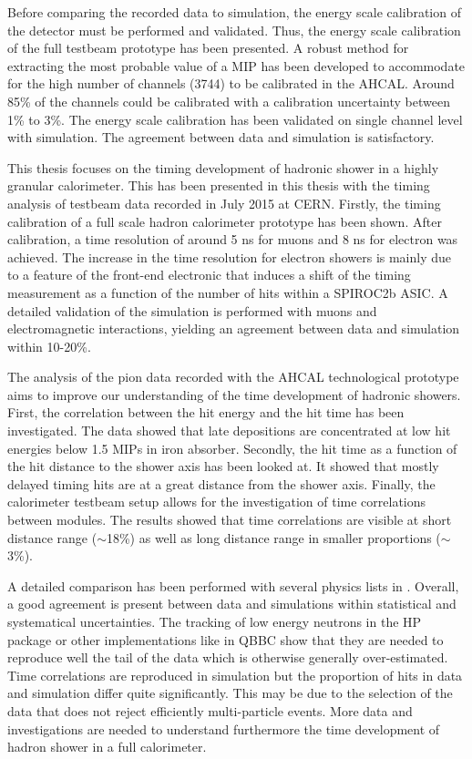 Before comparing the recorded data to simulation, the energy scale calibration of the detector must be performed and validated. Thus, the energy scale calibration of the full testbeam prototype has been presented. A robust method for extracting the most probable value of a MIP has been developed to accommodate for the high number of channels (3744) to be calibrated in the AHCAL. Around 85\% of the channels could be calibrated with a calibration uncertainty between 1\% to 3\%. The energy scale calibration has been validated on single channel level with simulation. The agreement between data and simulation is satisfactory.

This thesis focuses on the timing development of hadronic shower in a highly granular calorimeter. This has been presented in this thesis with the timing analysis of testbeam data recorded in July 2015 at CERN. Firstly, the timing calibration of a full scale hadron calorimeter prototype has been shown. After calibration, a time resolution of around 5 ns for muons and 8 ns for electron was achieved. The increase in the time resolution for electron showers is mainly due to a feature of the front-end electronic that induces a shift of the timing measurement as a function of the number of hits within a SPIROC2b ASIC. A detailed validation of the simulation is performed with muons and electromagnetic interactions, yielding an agreement between data and simulation within 10-20\%.

The analysis of the pion data recorded with the AHCAL technological prototype aims to improve our understanding of the time development of hadronic showers. First, the correlation between the hit energy and the hit time has been investigated. The data showed that late depositions are concentrated at low hit energies below 1.5 MIPs in iron absorber. Secondly, the hit time as a function of the hit distance to the shower axis has been looked at. It showed that mostly delayed timing hits are at a great distance from the shower axis. Finally, the calorimeter testbeam setup allows for the investigation of time correlations between modules. The results showed that time correlations are visible at short distance range ($\sim$18\%) as well as long distance range in smaller proportions ($\sim$3\%).

A detailed comparison has been performed with several physics lists in \geant. Overall, a good agreement is present between data and simulations within statistical and systematical uncertainties. The tracking of low energy neutrons in the HP package or other implementations like in QBBC show that they are needed to reproduce well the tail of the data which is otherwise generally over-estimated. Time correlations are reproduced in simulation but the proportion of hits in data and simulation differ quite significantly. This may be due to the selection of the data that does not reject efficiently multi-particle events. More data and investigations are needed to understand furthermore the time development of hadron shower in a full calorimeter.

